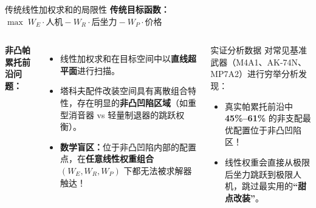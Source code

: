 \documentclass[aspectratio=169]{beamer}
\begin{document}
\begin{frame}{传统线性加权求和的局限性}
    \textbf{传统目标函数：} $\max \; W_E \cdot \text{人机} - W_R \cdot \text{后坐力} - W_P \cdot \text{价格}$
    
    \vspace{0.3cm}
    \begin{columns}
        \textbf{非凸帕累托前沿问题：}
        \begin{itemize}
            \item 线性加权求和在目标空间中以\textbf{直线超平面}进行扫描。
            \item 塔科夫配件改装空间具有离散组合特性，存在明显的\textbf{非凸凹陷区域}（如重型消音器 vs 轻量制退器的跳跃权衡）。
            \item \textbf{数学盲区：}位于非凸凹陷内部的配置点，在\textbf{任意线性权重组合} $(W_E, W_R, W_P)$ 下都无法被求解器触达！
        \end{itemize}

        \begin{block}{实证分析数据}
            对常见基准武器（M4A1、AK-74N、MP7A2）进行穷举分析发现：
            \begin{itemize}
                \item 真实帕累托前沿中 \textbf{45\%--61\%} 的非支配最优配置位于非凸凹陷区！
                \item 线性权重会直接从极限后坐力跳跃到极限人机，跳过最实用的\textbf{“甜点改装”}。
            \end{itemize}
        \end{block}
    \end{columns}
\end{frame}
\end{document}
